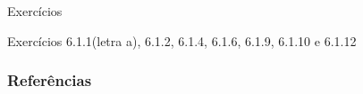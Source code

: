 \documentclass[12pt]{beamer}
\begin{document}
\begin{frame}{Exercícios}
\begin{block}{\Home}
\justifying
Exercícios 6.1.1(letra a), 6.1.2, 6.1.4, 6.1.6,
6.1.9, 6.1.10 e 6.1.12
\nocite{hogg, casella2021statistical, bolfarine}
\end{block}
\end{frame}

\begin{frame}[allowframebreaks]
\frametitle{\bf Referências}
\printbibliography
\end{frame}
\end{document}
